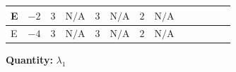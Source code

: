 \documentclass[8pt]{article}
\begin{document}
\begin{landscape}
\begin{longtable}{@{}llcccccc >{\raggedright\arraybackslash}p{0.21\linewidth} >{\raggedright\arraybackslash}p{0.21\linewidth} >{\raggedright\arraybackslash}p{0.21\linewidth}@{}}
\midrule
E & $-2$ & $3$ & $\text{N/A}$ & $3$ & $\text{N/A}$ & $2$ & $\text{N/A}$ & \scriptsize\adjustbox{max width=\linewidth}{$\begin{gathered} +\frac{9 {g_2}^4}{4}\end{gathered}$} & \scriptsize\adjustbox{max width=\linewidth}{$\begin{gathered} +{g_1}^2 \left(\frac{3 {g_2}^2}{2}-3 {\lambda_1}\right)\end{gathered}$} & \scriptsize\adjustbox{max width=\linewidth}{$\begin{gathered} -9 {g_2}^2 {\lambda_1}\end{gathered}$} \\
\midrule
E & $-4$ & $3$ & $\text{N/A}$ & $3$ & $\text{N/A}$ & $2$ & $\text{N/A}$ & \scriptsize\adjustbox{max width=\linewidth}{$\begin{gathered} +\frac{9 {g_2}^4}{4}\end{gathered}$} & \scriptsize\adjustbox{max width=\linewidth}{$\begin{gathered} +{g_1}^2 \left(\frac{3 {g_2}^2}{2}-3 {\lambda_1}\right)\end{gathered}$} & \scriptsize\adjustbox{max width=\linewidth}{$\begin{gathered} -9 {g_2}^2 {\lambda_1}\end{gathered}$} \\
\midrule
\bottomrule
\end{longtable}
\clearpage
\noindent\textbf{Quantity: }$\lambda_1$\par\smallskip

\end{landscape}
\end{document}
